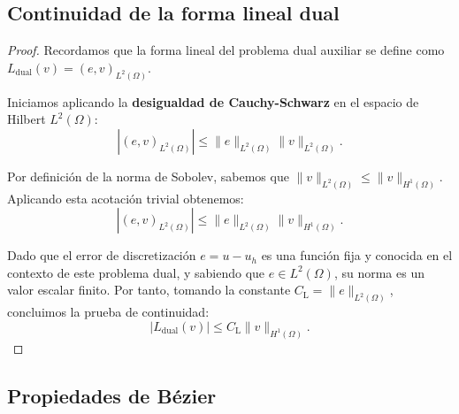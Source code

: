 \documentclass[11pt]{book}
\theoremstyle{plain} %
\theoremstyle{definition} %
\theoremstyle{definition} %
\begin{document}
\subsection{Continuidad de la forma lineal dual}
\label{sec:cont}
\begin{proof}
    Recordamos que la forma lineal del problema dual auxiliar se define como $L_\text{dual}(v)=(e,v)_{L^2(\Omega)}$.

    Iniciamos aplicando la \textbf{desigualdad de Cauchy-Schwarz} en el espacio de Hilbert $L^2(\Omega)$:
    \begin{equation*}
        |(e,v)_{L^2(\Omega)}| \leq \|e\|_{L^2(\Omega)}\|v\|_{L^2(\Omega)}.
    \end{equation*}
    
    Por definición de la norma de Sobolev, sabemos que $\|v\|_{L^2(\Omega)} \leq \|v\|_{H^1(\Omega)}$. Aplicando esta acotación trivial obtenemos:
    \begin{equation*}
        |(e,v)_{L^2(\Omega)}| \leq \|e\|_{L^2(\Omega)}\|v\|_{H^1(\Omega)}.
    \end{equation*}
    
    Dado que el error de discretización $e=u-u_h$ es una función fija y conocida en el contexto de este problema dual, y sabiendo que $e\in L^2(\Omega)$, su norma es un valor escalar finito. Por tanto, tomando la constante $C_\text{L}=\|e\|_{L^2(\Omega)}$, concluimos la prueba de continuidad:
    \begin{equation*}
        |L_\text{dual}(v)| \leq C_\text{L}\|v\|_{H^1(\Omega)}.
    \end{equation*}
\end{proof}
\subsection{Propiedades de Bézier}
\label{sec:Bezier_proof}
\end{document}
